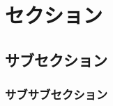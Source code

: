 \documentclass{ltjsarticle}
\begin{document}
\section{セクション}

\subsection{サブセクション}

\subsubsection{サブサブセクション}
\end{document}

